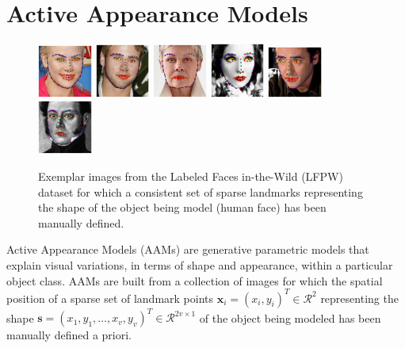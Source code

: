 \section{Active Appearance Models}
\label{sec:aam}

\begin{figure}
	\centering
	\includegraphics[width=0.16\textwidth]{figures/img0.png}
	\includegraphics[width=0.16\textwidth]{figures/img1.png}
	\includegraphics[width=0.16\textwidth]{figures/img2.png}
	\includegraphics[width=0.16\textwidth]{figures/img3.png}
	\includegraphics[width=0.16\textwidth]{figures/img4.png}
	\includegraphics[width=0.16\textwidth]{figures/img5.png}
	\caption{Exemplar images from the Labeled Faces in-the-Wild (LFPW) dataset \cite{Belhumeur2011} for which a consistent set of sparse landmarks representing the shape of the object being model (human face) has been manually defined.}
	\label{fig:afw_exp}
\end{figure}

Active Appearance Models (AAMs) \cite{Cootes2001,Matthews2004} are generative parametric models that explain visual variations, in terms of shape and appearance, within a particular object class. AAMs are built from a collection of images for which the spatial position of a sparse set of landmark points $\mathbf{x}_i = (x_i, y_i)^T \in \mathcal{R}^2$ representing the shape $\mathbf{s} = (x_1, y_1, \dots, x_v, y_v)^T \in \mathcal{R}^{2v \times 1}$ of the object being modeled has been manually defined a priori. 

